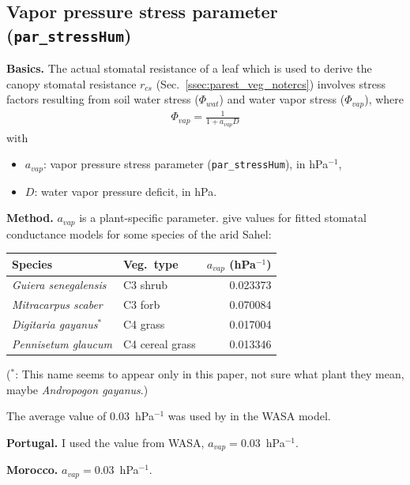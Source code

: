 \documentclass{scrreprt}
\newenvironment{denseitem}{
  \begin{itemize}
    \setlength{\itemsep}{0pt}
    \setlength{\parskip}{0pt}
    \setlength{\parsep}{0pt}
}{
  \end{itemize}
}
\begin{document}
\newpage
\subsection{Vapor pressure stress parameter (\texttt{par\_stressHum})} \label{ssec:parest_veg_parstresshum}

\textbf{Basics.}
The actual stomatal resistance of a leaf which is used to derive the canopy stomatal resistance $r_{cs}$ (Sec.~\ref{ssec:parest_veg_notercs}) involves stress factors resulting from soil water stress ($\Phi_{wat}$) and water vapor stress ($\Phi_{vap}$), where
\begin{align*}
  \Phi_{vap} = \frac{1}{1 + a_{vap} D}
\end{align*}
%
with
\begin{denseitem}
  \item[] $a_{vap}$: vapor pressure stress parameter (\verb!par_stressHum!), in hPa$^{-1}$,
  \item[] $D$: water vapor pressure deficit, in hPa.
\end{denseitem}

\noindent
\textbf{Method.}
$a_{vap}$ is a plant-specific parameter. \citet{hanan97} give values for fitted stomatal conductance models for some species of the arid Sahel:
%
\begin{table}[H]
  \centering
  \begin{tabular}{llr}
    Species                    & Veg.\ type      & $a_{vap}$ (hPa$^{-1}$) \\
    \hline
    \emph{Guiera senegalensis} & C3 shrub        & 0.023373 \\
    \emph{Mitracarpus scaber}  & C3 forb         & 0.070084 \\
    \emph{Digitaria gayanus}$^\ast$ & C4 grass & 0.017004 \\
    \emph{Pennisetum glaucum}  & C4 cereal grass & 0.013346
  \end{tabular}
  \label{tab:par_stressHum}
\end{table}
\noindent
($^\ast$: This name seems to appear only in this paper, not sure what plant they mean, maybe \emph{Andropogon gayanus}.)

\noindent
The average value of 0.03~hPa$^{-1}$ was used by \citet{guentner02} in the WASA model.

\noindent
\textbf{Portugal.}
I used the value from WASA, $a_{vap} = 0.03$~hPa$^{-1}$.

\noindent
\textbf{Morocco.}
$a_{vap} = 0.03$~hPa$^{-1}$.
\end{document}
